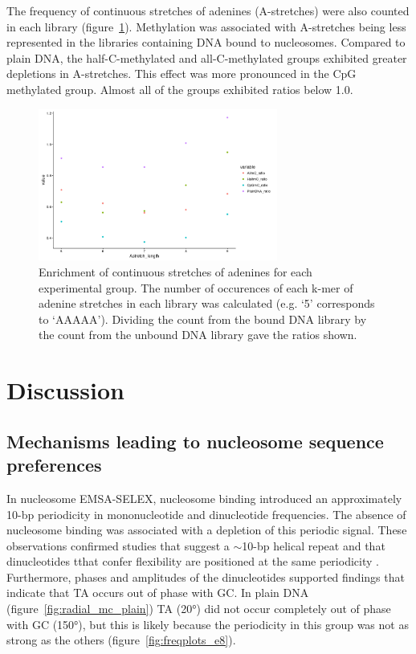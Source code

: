 \documentclass[parskip=full, numbers=noenddot]{scrreprt}
\begin{document}
The frequency of continuous stretches of adenines (A-stretches) were also counted in each library (figure~\ref{fig:astretch}).  Methylation was associated with A-stretches being less represented in the libraries containing DNA bound to nucleosomes.  Compared to plain DNA, the half-C-methylated and all-C-methylated groups exhibited greater depletions in A-stretches.  This effect was more pronounced in the CpG methylated group.  Almost all of the groups exhibited ratios below 1.0.

\begin{figure}[htb]
  \centering
  \includegraphics[width=0.7\textwidth]{astretch}
  \caption{Enrichment of continuous stretches of adenines for each experimental group.  The number of occurences of each k-mer of adenine stretches in each library was calculated (e.g. `5' corresponds to `AAAAA').  Dividing the count from the bound DNA library by the count from the unbound DNA library gave the ratios shown.}
  \label{fig:astretch}
\end{figure}

\section{Discussion}
\label{sec:emsaselex_discussion}

\subsection{Mechanisms leading to nucleosome sequence preferences}
\label{ssec:emsaselex_discussion_seqpref}

In nucleosome EMSA-SELEX, nucleosome binding introduced an approximately 10-bp periodicity in mononucleotide and dinucleotide frequencies.  The absence of nucleosome binding was associated with a depletion of this periodic signal.  These observations confirmed studies that suggest a $\sim$10-bp helical repeat and that dinucleotides tthat confer flexibility are positioned at the same periodicity \citep{struhl_determinants_2013}.  Furthermore, phases and amplitudes of the dinucleotides supported findings that indicate that TA occurs out of phase with GC.  In plain DNA (figure~\ref{fig:radial_mc_plain}) TA (\ang{20}) did not occur completely out of phase with GC (\ang{150}), but this is likely because the periodicity in this group was not as strong as the others (figure~\ref{fig:freqplots_e8}).
\end{document}
